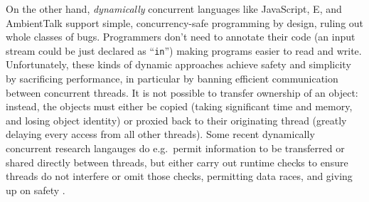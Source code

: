 On the other hand,
\textit{dynamically} concurrent languages like
JavaScript\cite{JSVAts},
E\cite{MillerPhD}, and
AmbientTalk\cite{AmbientTalk} support simple,
concurrency-safe programming by design, ruling out whole classes of
bugs.
Programmers don't need to annotate their code
(an input stream could be just declared as ``\verb+in+'')
making programs easier to read and write.
Unfortunately, these kinds of dynamic approaches achieve safety and simplicity
by sacrificing performance, in particular by banning efficient
communication between concurrent threads.
It is not possible to transfer ownership of an object:
instead, the objects must either be copied
\cite{destructive-read}
%
(taking significant time and memory, and losing object identity)
or proxied back to their originating thread
\cite{CASTEGREN2018130,JSproxies,AmbientTalk}
(greatly delaying every access from all other threads).
Some recent dynamically concurrent research langauges do e.g.\ permit
information to be transferred or shared directly between threads,
but either carry out runtime checks to ensure threads do not interfere
\cite{Daloze2016,Daloze2018}
or omit those checks, permitting data races, and giving up on safety
\cite{GoConcurBugs2019,raffi2020}.



